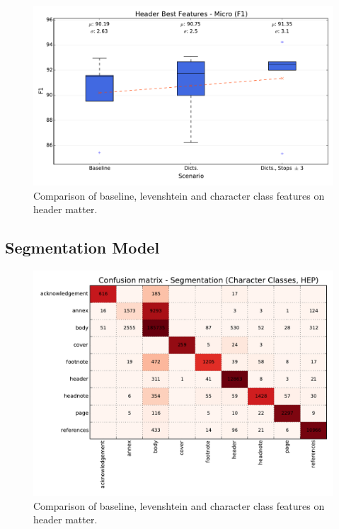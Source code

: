 \begin{figure}[h]
\center
\includegraphics[width=5.5in]{Figures/micro_header.pdf}
\caption{Comparison of baseline, levenshtein and character class features on header matter.}
\label{fig:micro}
\end{figure}

\subsection{Segmentation Model}

\begin{figure}[h]
\center
\includegraphics[width=5.5in]{Figures/classes_confusion_segmentation.pdf}
\caption{Comparison of baseline, levenshtein and character class features on header matter.}
\label{fig:micro}
\end{figure}

